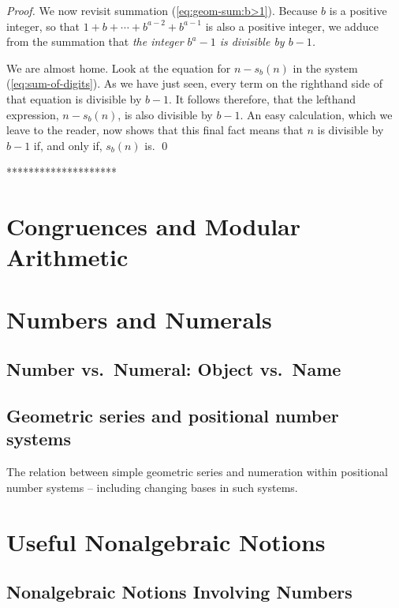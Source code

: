 {\begin{proof}
We now revisit summation (\ref{eq:geom-sum:b>1}).  Because $b$ is a
positive integer, so that $1 + b + \cdots + b^{a-2} + b^{a-1}$ is also
a positive integer, we adduce from the summation that {\em the integer
  $b^a -1$ is divisible by $b-1$.}

We are almost home.  Look at the equation for $n - s_b(n)$ in the
system (\ref{eq:sum-of-digits}).  As we have just seen, every term on
the righthand side of that equation is divisible by $b-1$.  It follows
therefore, that the lefthand expression, $n - s_b(n)$, is also
divisible by $b-1$.  An easy calculation, which we leave to the
reader, now shows that this final fact means that $n$ is divisible by
$b-1$ if, and only if, $s_b(n)$ is.  \qed
\end{proof}
********************}




\section{Congruences and Modular Arithmetic}



\section{Numbers and Numerals}

\subsection{Number vs.~Numeral: Object vs.~Name}


\subsection{Geometric series and positional number systems}

The relation between simple geometric series and numeration within
positional number systems -- including changing bases in such systems.


\section{Useful Nonalgebraic Notions}
\label{sec:extra-functions}

\subsection{Nonalgebraic Notions Involving Numbers}


